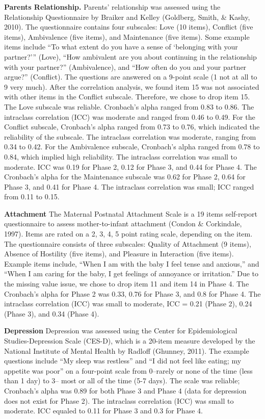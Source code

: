 \documentclass[man]{apa6}
\begin{document}
\textbf{Parents Relationship.}
Parents' relationship was assessed using the Relationship Questionnaire by Braiker and Kelley (Goldberg, Smith, \& Kashy, 2010). The questionnaire contains four subscales: Love (10 items), Conflict (five items), Ambivalence (five items), and Maintenance (five items). Some example items include \enquote{To what extent do you have a sense of \enquote{belonging with your partner?}} (Love), \enquote{How ambivalent are you about continuing in the relationship with your partner?} (Ambivalence), and \enquote{How often do you and your partner argue?} (Conflict). The questions are answered on a 9-point scale (1 not at all to 9 very much). After the correlation analysis, we found item 15 was not associated with other items in the Conflict subscale. Therefore, we chose to drop item 15. The Love subscale was reliable. Cronbach's alpha ranged from 0.83 to 0.86. The intraclass correlation (ICC) was moderate and ranged from 0.46 to 0.49. For the Conflict subscale, Cronbach's alpha ranged from 0.73 to 0.76, which indicated the reliability of the subscale. The intraclass correlation was moderate, ranging from 0.34 to 0.42. For the Ambivalence subscale, Cronbach's alpha ranged from 0.78 to 0.84, which implied high reliability. The intraclass correlation was small to moderate. ICC was 0.19 for Phase 2, 0.12 for Phase 3, and 0.44 for Phase 4. The Cronbach's alpha for the Maintenance subscale was 0.62 for Phase 2, 0.64 for Phase 3, and 0.41 for Phase 4. The intraclass correlation was small; ICC ranged from 0.11 to 0.15.

\textbf{Attachment}
The Maternal Postnatal Attachment Scale is a 19 items self-report questionnaire to assess mother-to-infant attachment (Condon \& Corkindale, 1997). Items are rated on a 2, 3, 4, 5 point rating scale, depending on the item. The questionnaire consists of three subscales: Quality of Attachment (9 items), Absence of Hostility (five items), and Pleasure in Interaction (five items). Example items include, \enquote{When I am with the baby I feel tense and anxious,} and \enquote{When I am caring for the baby, I get feelings of annoyance or irritation.} Due to the missing value issue, we chose to drop item 11 and item 14 in Phase 4. The Cronbach's alpha for Phase 2 was 0.33, 0.76 for Phase 3, and 0.8 for Phase 4. The intraclass correlation (ICC) was small to moderate, ICC = 0.21 (Phase 2), 0.24 (Phase 3), and 0.34 (Phase 4).

\textbf{Depression}
Depression was assessed using the Center for Epidemiological Studies-Depression Scale (CES-D), which is a 20-item measure developed by the National Institute of Mental Health by Radloff (Ghunney, 2011). The example questions include \enquote{My sleep was restless} and \enquote{I did not feel like eating; my appetite was poor} on a four-point scale from 0--rarely or none of the time (less than 1 day) to 3-- most or all of the time (5-7 days). The scale was reliable; Cronbach's alpha was 0.89 for both Phase 3 and Phase 4 (data for depression does not exist for Phase 2). The intraclass correlation (ICC) was small to moderate. ICC equaled to 0.11 for Phase 3 and 0.3 for Phase 4.
\end{document}
